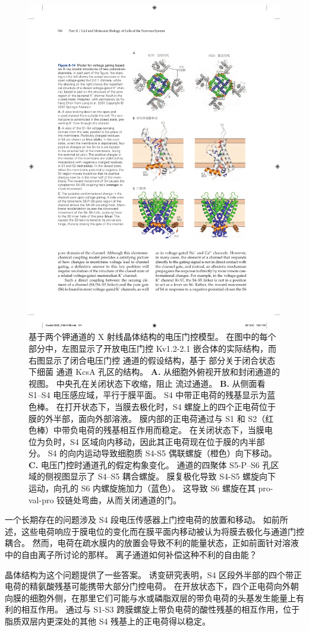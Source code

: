 \begin{figure}[htbp]
	\centering
	\includegraphics[width=0.6\linewidth]{chap08/fig_8_14}
	\caption{基于两个钾通道的 X 射线晶体结构的电压门控模型。
		在图中的每个部分中，左图显示了开放电压门控 Kv1.2-2.1 嵌合体的实际结构，而右图显示了闭合电压门控  通道的假设结构，基于 部分关于闭合状态下细菌  通道 KcsA 孔区的结构。
		\textbf{A.} 从细胞外俯视开放和封闭通道的视图。
		中央孔在关闭状态下收缩，阻止  流过通道。
		\textbf{B.} 从侧面看 S1–S4 电压感应域，平行于膜平面。
		S4 中带正电荷的残基显示为蓝色棒。
		在打开状态下，当膜去极化时，S4 螺旋上的四个正电荷位于膜的外半部，面向外部溶液。
		膜内部的正电荷通过与 S1 和 S2（红色棒）中带负电荷的残基相互作用而稳定。
		在关闭状态下，当膜电位为负时，S4 区域向内移动，因此其正电荷现在位于膜的内半部分。
		S4 的向内运动导致细胞质 S4-S5 偶联螺旋（橙色）向下移动。
		\textbf{C.} 电压门控时通道孔的假定构象变化。
		通道的四聚体 S5-P–S6 孔区域的侧视图显示了 S4–S5 耦合螺旋。
		膜复极化导致 S4-S5 螺旋向下运动，向孔的 S6 内螺旋施加力（蓝色）。
		这导致 S6 螺旋在其 pro-val-pro 铰链处弯曲，从而关闭通道的门。}
	\label{fig:8_14}
\end{figure}


一个长期存在的问题涉及 S4 段电压传感器上门控电荷的放置和移动。
如前所述，这些电荷响应于膜电位的变化而在膜平面内移动被认为将膜去极化与通道门控耦合。
然而，电荷在疏水膜内的放置会导致不利的能量状态，正如前面针对溶液中的自由离子所讨论的那样。
离子通道如何补偿这种不利的自由能？


晶体结构为这个问题提供了一些答案。
诱变研究表明，S4 区段外半部的四个带正电荷的精氨酸残基可能携带大部分门控电荷。
在开放状态下，四个正电荷向外朝向膜的细胞外侧，在那里它们可能与水或磷脂双层的带负电荷的头基发生能量上有利的相互作用。
通过与 S1-S3 跨膜螺旋上带负电荷的酸性残基的相互作用，位于脂质双层内更深处的其他 S4 残基上的正电荷得以稳定。


